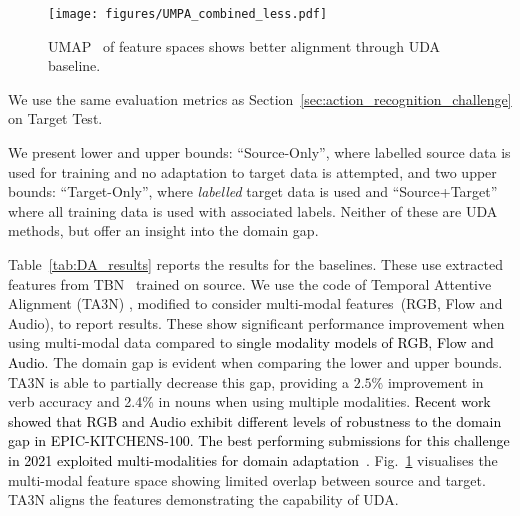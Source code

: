 \documentclass[twocolumn]{svjour3}          \smartqed
\newcommand{\chParagraph}[1]{\noindent {\textbf{#1.}} \hspace{6pt}}
\newcommand{\edits}[1]{\textcolor{black}{#1}}
\newcommand {\newDataset} {EPIC-KITCHENS-100}
\begin{document}
\begin{figure}[t!]
\centering
   \texttt{[image: figures/UMPA\_combined\_less.pdf]}
\caption{UMAP~\cite{mcinnes2018umap} of feature spaces shows better alignment through UDA baseline.}\label{fig:UD_visualisation}\end{figure}

\chParagraph{Evaluation}
We use the same evaluation metrics as Section~\ref{sec:action_recognition_challenge} on Target Test.

\chParagraph{Baselines and Results}
We present lower and upper bounds: ``Source-Only'', where labelled source data is used for training and no adaptation to target data is attempted, and two upper bounds: ``Target-Only'', where \textit{labelled} target data is used and ``Source+Target'' where all training data is used with associated labels. Neither of these are UDA methods, but offer an insight into the domain gap.

Table~\ref{tab:DA_results} reports the results for the baselines. These use extracted features from TBN~\cite{kazakos2019epic} trained on source.
We use the code of Temporal Attentive Alignment (TA3N) \cite{Chen2019}, modified to consider multi-modal features~(RGB, Flow and Audio), to report results. 
These show significant performance improvement when using multi-modal data compared to \edits{single modality models of RGB, Flow and Audio}.
The domain gap is evident when comparing the lower and upper bounds. TA3N is able to partially decrease this gap, providing a $2.5\%$ improvement in verb accuracy and 2.4\% in nouns when using multiple modalities. 
\edits{Recent work~\cite{planamente2021cross} showed that RGB and Audio exhibit different levels of robustness to the domain gap in \newDataset. The best performing submissions for this challenge in 2021 exploited multi-modalities for domain adaptation~\cite{yang2021epic,plizzari2021polito}.} Fig.~\ref{fig:UD_visualisation} visualises the multi-modal feature space showing limited overlap between source and target. TA3N aligns the features demonstrating the capability of UDA. 
\end{document}
